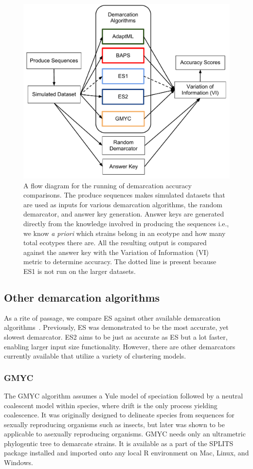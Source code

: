 \begin{figure}[h!]
\centering
\includegraphics[scale=0.75]{images/DemarcationComparisonsFlow-CH4}
\caption[Demarcation comparison flow diagram.]{A flow diagram for the running of demarcation accuracy comparisons. The produce sequences makes simulated datasets that are used as inputs for various demarcation algorithms, the random demarcator, and answer key generation. Answer keys are generated directly from the knowledge involved in producing the sequences i.e., we know \emph{a priori} which strains belong in an ecotype and how many total ecotypes there are. All the resulting output is compared against the answer key with the Variation of Information (VI) metric to determine accuracy. The dotted line is present because ES1 is not run on the larger datasets.}
\label{fig:ComparisonFlow}
\end{figure}

\subsection*{Other demarcation algorithms}
As a rite of passage, we compare ES against other available demarcation algorithms~\cite{carlo}.
Previously, ES was demonstrated to be the most accurate, yet slowest demarcator.
ES2 aims to be just as accurate as ES but a lot faster, enabling larger input size functionality.
However, there are other demarcators currently available that utilize a variety of clustering models.

\subsubsection*{GMYC~\cite{barraclough2009inferring}}
The GMYC algorithm assumes a Yule model of speciation followed by a neutral coalescent model within species, where drift is the only process yielding coalescence.
It was originally designed to delineate species from sequences for sexually reproducing organisms such as insects, but later was shown to be applicable to asexually reproducing organisms.
GMYC needs only an ultrametric phylogentic tree to demarcate strains.
It is available as a part of the SPLITS package installed and imported onto any local R environment on Mac, Linux, and Windows.

